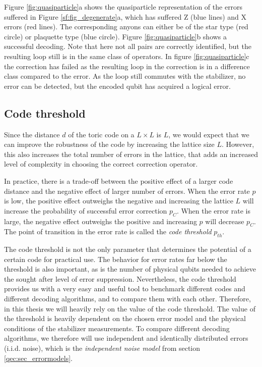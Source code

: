 Figure \ref{fig:quasiparticle}a shows the quasiparticle representation of the errors suffered in Figure \ref{sf:fig_degenerate}a, which has suffered Z (blue lines) and X errors (red lines). The corresponding anyons can either be of the star type (red circle) or plaquette type (blue circle). Figure \ref{fig:quasiparticle}b shows a successful decoding. Note that here not all pairs are correctly identified, but the resulting loop still is in the same class of operators. In figure \ref{fig:quasiparticle}c the correction has failed as the resulting loop in the correction is in a difference class compared to the error. As the loop still commutes with the stabilizer, no error can be detected, but the encoded qubit has acquired a logical error.

\subsection{Code threshold}
Since the distance $d$ of the toric code on a $L\times L$ is $L$, we would expect that we can improve the robustness of the code by increasing the lattice size $L$. However, this also increases the total number of errors in the lattice, that adds an increased level of complexity in choosing the correct correction operator.

In practice, there is a trade-off between the positive effect of a larger code distance and the negative effect of larger number of errors. When the error rate $p$ is low, the positive effect outweighs the negative and increasing the lattice $L$ will increase the probability of successful error correction $p_C$. When the error rate is large, the negative effect outweighs the positive and increasing $p$ will decrease $p_C$. The point of transition in the error rate is called the \emph{code threshold} $p_{th}$.

The code threshold is not the only parameter that determines the potential of a certain code for practical use. The behavior for error rates far below the threshold is also important, as is the number of physical qubits needed to achieve the sought after level of error suppression. Nevertheless, the code threshold provides us with a very easy and useful tool to benchmark different codes and different decoding algorithms, and to compare them with each other. Therefore, in this thesis we will heavily rely on the value of the code threshold. The value of the threshold is heavily dependent on the chosen error model and the physical conditions of the stabilizer measurements. To compare different decoding algorithms, we therefore will use independent and identically distributed errors (i.i.d. noise), which is the \emph{independent noise model} from section \ref{qec:sec_errormodels}.

